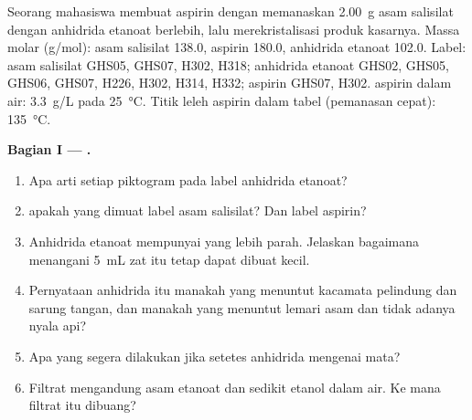 \begin{problem}
\label{pb:b1:lab-techniques-1:1}
Seorang mahasiswa membuat aspirin dengan memanaskan \qty{2.00}{g} asam
salisilat dengan anhidrida etanoat berlebih, lalu merekristalisasi
produk kasarnya. Massa molar (\unit{g/mol}): asam salisilat 
138.0, aspirin  180.0, anhidrida etanoat  102.0.
Label: asam salisilat GHS05, GHS07, H302, H318; anhidrida etanoat GHS02,
GHS05, GHS06, GHS07, H226, H302, H314, H332; aspirin GHS07, H302.
 aspirin dalam air: \qty{3.3}{g/L} pada \qty{25}{\celsius}.
Titik leleh aspirin dalam tabel (pemanasan cepat): \qty{135}{\celsius}.

\medskip
\noindent\textbf{Bagian I --- .}
\begin{enumerate}
  \item Apa arti setiap piktogram pada label anhidrida etanoat?
  \item {} apakah yang dimuat label asam salisilat? Dan label
        aspirin?
  \item Anhidrida etanoat mempunyai  yang lebih parah. Jelaskan
        bagaimana  menangani \qty{5}{mL} zat itu tetap dapat dibuat
        kecil.
  \item Pernyataan anhidrida itu manakah yang menuntut kacamata pelindung
        dan sarung tangan, dan manakah yang menuntut lemari asam dan
        tidak adanya nyala api?
  \item Apa yang segera dilakukan jika setetes anhidrida mengenai mata?
  \item Filtrat  mengandung asam etanoat dan sedikit etanol
        dalam air. Ke mana filtrat itu dibuang?
\end{enumerate}


\end{problem}
